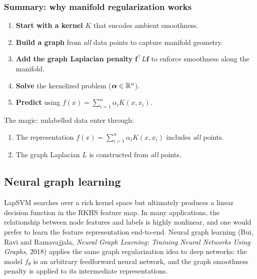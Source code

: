 \begin{notechapter}
\subsubsection*{Summary: why manifold regularization works}

\begin{keyidea}
\begin{enumerate}
  \item \textbf{Start with a kernel} $K$ that encodes ambient smoothness.
  \item \textbf{Build a graph} from \emph{all} data points to capture
    manifold geometry.
  \item \textbf{Add the graph Laplacian penalty} $\mathbf{f}^\top L
    \mathbf{f}$ to enforce smoothness along the manifold.
  \item \textbf{Solve} the kernelized problem ($\boldsymbol{\alpha} \in \mathbb{R}^n$).
  \item \textbf{Predict} using $f(x) = \sum_{i=1}^n \alpha_i K(x, x_i)$.
\end{enumerate}

The magic: unlabelled data enter through:
\begin{enumerate}[label=(\alph*)]
  \item The representation $f(x) = \sum_{i=1}^n \alpha_i K(x, x_i)$
    includes \emph{all} points.
  \item The graph Laplacian $L$ is constructed from \emph{all}
    points.
\end{enumerate}
\end{keyidea}

\subsection{Neural graph learning}
\label{semi-supervised-graphs:subsec:neural_graph}

LapSVM searches over a rich kernel space but ultimately produces a linear
decision function in the RKHS feature map. In many applications, the
relationship between node features and labels is highly nonlinear, and one
would prefer to learn the feature representation end-to-end. Neural graph
learning (Bui, Ravi and Ramavajjala, \emph{Neural Graph Learning: Training Neural Networks Using Graphs}, 2018) applies the same graph regularization idea to deep
networks: the model $f_\theta$ is an arbitrary feedforward neural network, and
the graph smoothness penalty is applied to its intermediate representations.


\end{notechapter}
